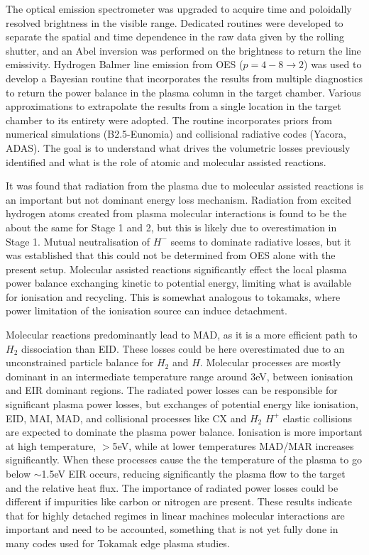The optical emission spectrometer was upgraded to acquire time and poloidally resolved brightness in the visible range. Dedicated routines were developed to separate the spatial and time dependence in the raw data given by the rolling shutter, and an Abel inversion was performed on the brightness to return the line emissivity. Hydrogen Balmer line emission from OES ($p=4-8 \rightarrow 2$) was used to develop a Bayesian routine that incorporates the results from multiple diagnostics to return the power balance in the plasma column in the target chamber. Various approximations to extrapolate the results from a single location in the target chamber to its entirety were adopted. The routine incorporates priors from numerical simulations (B2.5-Eunomia) and collisional radiative codes (Yacora, ADAS). The goal is to understand what drives the volumetric losses previously identified and what is the role of atomic and molecular assisted reactions.

It was found that radiation from the plasma due to molecular assisted reactions is an important but not dominant energy loss mechanism. Radiation from excited hydrogen atoms created from plasma molecular interactions is found to be the about the same for Stage 1 and 2, but this is likely due to overestimation in Stage 1. Mutual neutralisation of ${H}^-$ seems to dominate radiative losses, but it was established that this could not be determined from OES alone with the present setup. Molecular assisted reactions significantly effect the local plasma power balance exchanging kinetic to potential energy, limiting what is available for ionisation and recycling. This is somewhat analogous to tokamaks, where power limitation of the ionisation source can induce detachment\cite{Verhaegh2018}.



Molecular reactions predominantly lead to MAD, as it is a more efficient path to $H_2$ dissociation than EID. These losses could be here overestimated due to an unconstrained particle balance for $H_2$ and $H$. Molecular processes are mostly dominant in an intermediate temperature range around 3eV, between ionisation and EIR dominant regions. The radiated power losses can be responsible for significant plasma power losses, but exchanges of potential energy like ionisation, EID, MAI, MAD, and collisional processes like CX and $H_2$ $H^+$ elastic collisions are expected to dominate the plasma power balance. Ionisation is more important at high temperature, $>$5eV, while at lower temperatures MAD/MAR increases significantly. When these processes cause the the temperature of the plasma to go below $\sim$1.5eV EIR occurs, reducing significantly the plasma flow to the target and the relative heat flux. The importance of radiated power losses could be different if impurities like carbon or nitrogen are present. These results indicate that for highly detached regimes in linear machines molecular interactions are important and need to be accounted, something that is not yet fully done in many codes used for Tokamak edge plasma studies.
